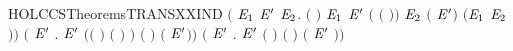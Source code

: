 \begin{SaveVerbatim}{HOLCCSTheoremsTRANSXXIND}
       \ensuremath{(}\HOLSymConst{\HOLTokenForall{}}  \ensuremath{\HOLBoundVar{E}\sb{\mathrm{1}}} \ensuremath{\HOLBoundVar{E}\sp{\prime{}}} \ensuremath{\HOLBoundVar{E}\sb{\mathrm{2}}}.
            \ensuremath{(} \ensuremath{)} \ensuremath{\HOLBoundVar{E}\sb{\mathrm{1}}} \HOLSymConst{\HOLTokenConj{}}  \ensuremath{\HOLBoundVar{E}\sp{\prime{}}} \ensuremath{(} \ensuremath{(} \ensuremath{)}\ensuremath{)} \ensuremath{\HOLBoundVar{E}\sb{\mathrm{2}}} \HOLSymConst{\HOLTokenImp{}}
           \ensuremath{(} \HOLSymConst{\ensuremath{\mid}} \ensuremath{\HOLBoundVar{E}\sp{\prime{}}}\ensuremath{)} \HOLConst{\ensuremath{\tau}} \ensuremath{(}\ensuremath{\HOLBoundVar{E}\sb{\mathrm{1}}} \HOLSymConst{\ensuremath{\mid}} \ensuremath{\HOLBoundVar{E}\sb{\mathrm{2}}}\ensuremath{)}\ensuremath{)} \HOLSymConst{\HOLTokenConj{}}
       \ensuremath{(}\HOLSymConst{\HOLTokenForall{}}  \ensuremath{\HOLBoundVar{E}\sp{\prime{}}}  .
             \ensuremath{\HOLBoundVar{E}\sp{\prime{}}} \HOLSymConst{\HOLTokenConj{}}
          \ensuremath{(}\ensuremath{(} \HOLSymConst{\ensuremath{=}} \HOLConst{\ensuremath{\tau}}\ensuremath{)} \HOLSymConst{\HOLTokenDisj{}} \ensuremath{(} \HOLSymConst{\ensuremath{=}}  \ensuremath{)} \HOLSymConst{\HOLTokenConj{}}  \HOLConst{\HOLTokenNotIn{}}  \HOLSymConst{\HOLTokenConj{}}   \HOLConst{\HOLTokenNotIn{}} \ensuremath{)} \HOLSymConst{\HOLTokenImp{}}
           \ensuremath{(}  \ensuremath{)}  \ensuremath{(}  \ensuremath{\HOLBoundVar{E}\sp{\prime{}}}\ensuremath{)}\ensuremath{)} \HOLSymConst{\HOLTokenConj{}}
       \ensuremath{(}\HOLSymConst{\HOLTokenForall{}}  \ensuremath{\HOLBoundVar{E}\sp{\prime{}}} .
             \ensuremath{\HOLBoundVar{E}\sp{\prime{}}} \HOLSymConst{\HOLTokenImp{}}  \ensuremath{(}  \ensuremath{)} \ensuremath{(}  \ensuremath{)} \ensuremath{(} \ensuremath{\HOLBoundVar{E}\sp{\prime{}}} \ensuremath{)}\ensuremath{)} \HOLSymConst{\HOLTokenConj{}}

\end{SaveVerbatim}
